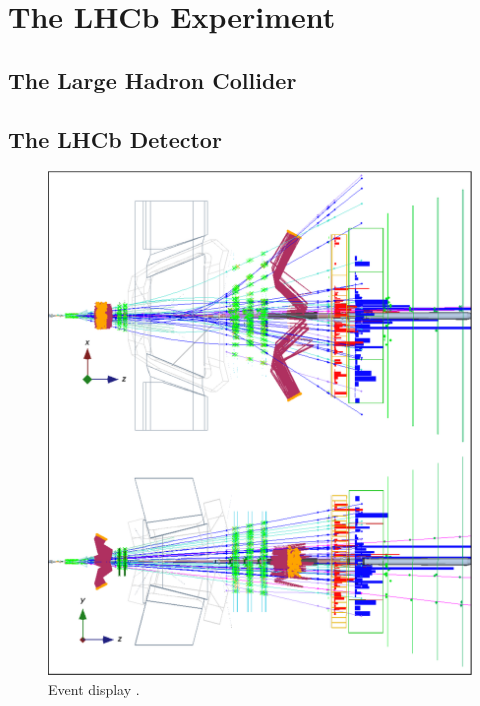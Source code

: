 \section{The LHCb Experiment}
\label{sec:intro_LHCb}
\subsection{The Large Hadron Collider}
\subsection{The LHCb Detector}

\begin{figure}[p]
  \centering
  \includegraphics[width=\textwidth]{graphics/intro/eventdisplay}
  \caption{Event display \cite{vanEijk:2012}.}
  \label{fig:LHCb}
\end{figure}

